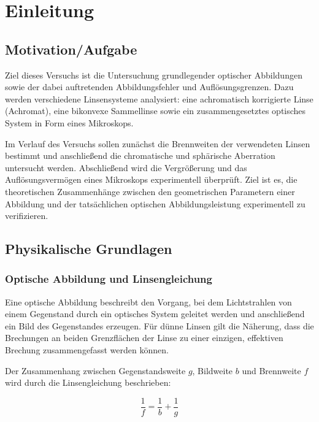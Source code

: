 \chapter{Einleitung}
\label{ch:einleitung}

\section{Motivation/Aufgabe}

Ziel dieses Versuchs ist die Untersuchung grundlegender optischer Abbildungen sowie der dabei auftretenden Abbildungsfehler und Auflösungsgrenzen. Dazu werden verschiedene Linsensysteme analysiert: eine achromatisch korrigierte Linse (Achromat), eine bikonvexe Sammellinse sowie ein zusammengesetztes optisches System in Form eines Mikroskops. 

Im Verlauf des Versuchs sollen zunächst die Brennweiten der verwendeten Linsen bestimmt und anschließend die chromatische und sphärische Aberration untersucht werden. Abschließend wird die Vergrößerung und das Auflösungsvermögen eines Mikroskops experimentell überprüft. Ziel ist es, die theoretischen Zusammenhänge zwischen den geometrischen Parametern einer Abbildung und der tatsächlichen optischen Abbildungsleistung experimentell zu verifizieren.

\section{Physikalische Grundlagen}
\cite{demtroeder17,skript25}

\subsection*{Optische Abbildung und Linsengleichung}

Eine optische Abbildung beschreibt den Vorgang, bei dem Lichtstrahlen von einem Gegenstand durch ein optisches System geleitet werden und anschließend ein Bild des Gegenstandes erzeugen. Für dünne Linsen gilt die Näherung, dass die Brechungen an beiden Grenzflächen der Linse zu einer einzigen, effektiven Brechung zusammengefasst werden können. 

Der Zusammenhang zwischen Gegenstandsweite $g$, Bildweite $b$ und Brennweite $f$ wird durch die Linsengleichung beschrieben:

\begin{equation}
    \frac{1}{f} = \frac{1}{b} + \frac{1}{g}
    \label{eq:linsengleichung}
\end{equation}

